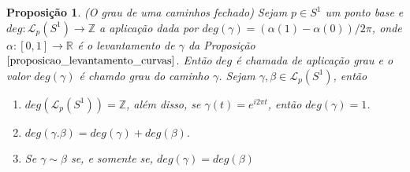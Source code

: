 \documentclass[12pt]{book}
\newtheorem{proposicao}[teorema]{Proposição}
\newcommand{\caminhospontobasegeral}[2]{\mathcal{L}_{#1}(#2)}
\newcommand{\circulo}{S^{1}}
\newcommand{\inteiros}{\mathbb{Z}}
\newcommand{\real}[1]{\mathbb{R}^{#1}}
\begin{document}
		\begin{proposicao}\label{proposicao_grau_aplicacao}
			(O grau de uma caminhos fechado) Sejam $p \in \circulo$ um ponto base e $deg: \caminhospontobasegeral{p}{\circulo} \to \inteiros$ a aplicação dada por $deg(\gamma) = (\alpha(1)-\alpha(0))/2\pi$, onde $\alpha:[0,1] \to \real{}$ é o levantamento de $\gamma$ da Proposição $\ref{proposicao_levantamento_curvas}$. Então $deg$ é chamada de aplicação grau e o valor $deg(\gamma)$ é chamdo grau do caminho $\gamma$. Sejam $\gamma, \beta \in \caminhospontobasegeral{p}{\circulo}$, então
			\begin{enumerate}
				\item $deg(\caminhospontobasegeral{p}{\circulo}) = \inteiros$, além disso, se $\gamma(t) = e^{i2\pi t}$, então $deg(\gamma) = 1$.
				\item $deg(\gamma.\beta)=deg(\gamma)+deg(\beta)$.
				\item Se $\gamma\sim \beta$ se, e somente se, $deg(\gamma)=deg(\beta)$
			\end{enumerate}
		\end{proposicao}
\end{document}
